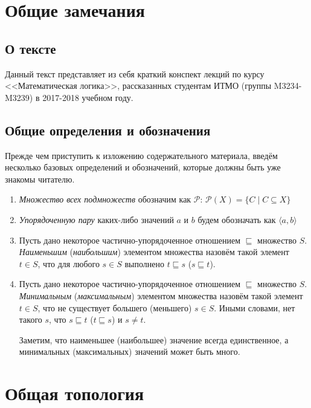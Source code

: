 \section{Общие замечания}

\subsection{О тексте}

Данный текст представляет из себя краткий конспект лекций по курсу
<<Математическая логика>>, рассказанных студентам ИТМО (группы M3234-M3239)
в 2017-2018 учебном году.

\subsection{Общие определения и обозначения}

Прежде чем приступить к изложению содержательного материала, введём несколько
базовых определений и обозначений, которые должны быть уже знакомы читателю.

\begin{enumerate}
\item \emph{Множество всех подмножеств} обозначим как $\mathcal{P}$:
$\mathcal{P}(X) = \{ C \mid C \subseteq X \}$

\item \emph{Упорядоченную пару} каких-либо значений $a$ и $b$ 
будем обозначать как $\langle a, b \rangle$

\item Пусть дано некоторое частично-упорядоченное отношением $\sqsubseteq$ множество $S$.
\emph{Наименьшим} (\emph{наибольшим}) элементом множества назовём такой элемент $t \in S$, 
что для любого $s \in S$ выполнено $t \sqsubseteq s$ ($s \sqsubseteq t$).

\item Пусть дано некоторое частично-упорядоченное отношением $\sqsubseteq$ множество $S$.
\emph{Минимальным} (\emph{максимальным}) элементом множества назовём такой элемент $t \in S$, 
что не существует большего (меньшего) $s \in S$. Иными словами, нет такого $s$, что
$s \sqsubseteq t$ ($t \sqsubseteq s$) и $s \ne t$.

Заметим, что наименьшее (наибольшее) значение всегда единственное, а минимальных
(максимальных) значений может быть много.

\end{enumerate}

\section{Общая топология}

